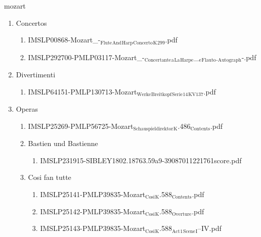 \documentclass[11pt]{article}
\begin{document}
\item mozart
\label{sec-1-1-1-1-44-49}
\begin{enumerate}
\item Concertos
\label{sec-1-1-1-1-44-49-1}
\begin{enumerate}
\item IMSLP00868-Mozart\_-$_{\text{Flute}}$$_{\text{And}}$$_{\text{Harp}}$$_{\text{Concerto}}$$_{\text{K}}$$_{\text{299}}$.pdf
\label{sec-1-1-1-1-44-49-1-1}

\item IMSLP292700-PMLP03117-Mozart\_-$_{\text{Concertante}}$$_{\text{a}}$$_{\text{La}}$$_{\text{Harpe}}$\_$_{\text{e}}$$_{\text{Flauto}}$$_{\text{-Autograph}}$-.pdf
\label{sec-1-1-1-1-44-49-1-2}
\end{enumerate}

\item Divertimenti
\label{sec-1-1-1-1-44-49-2}
\begin{enumerate}
\item IMSLP64151-PMLP130713-Mozart$_{\text{Werke}}$$_{\text{Breitkopf}}$$_{\text{Serie}}$$_{\text{14}}$$_{\text{KV137}}$.pdf
\label{sec-1-1-1-1-44-49-2-1}
\end{enumerate}

\item Operas
\label{sec-1-1-1-1-44-49-3}
\begin{enumerate}
\item IMSLP25269-PMLP56725-Mozart$_{\text{Schauspieldirektor}}$$_{\text{K}}$.486$_{\text{Contents}}$.pdf
\label{sec-1-1-1-1-44-49-3-1}

\item Bastien und Bastienne
\label{sec-1-1-1-1-44-49-3-2}
\begin{enumerate}
\item IMSLP231915-SIBLEY1802.18763.59a9-39087011221761score.pdf
\label{sec-1-1-1-1-44-49-3-2-1}
\end{enumerate}

\item Cosi fan tutte
\label{sec-1-1-1-1-44-49-3-3}
\begin{enumerate}
\item IMSLP25141-PMLP39835-Mozart$_{\text{Cosi}}$$_{\text{K}}$.588$_{\text{Contents}}$.pdf
\label{sec-1-1-1-1-44-49-3-3-1}

\item IMSLP25142-PMLP39835-Mozart$_{\text{Cosi}}$$_{\text{K}}$.588$_{\text{Overture}}$.pdf
\label{sec-1-1-1-1-44-49-3-3-2}

\item IMSLP25143-PMLP39835-Mozart$_{\text{Cosi}}$$_{\text{K}}$.588$_{\text{Act}}$$_{\text{1}}$$_{\text{Scene}}$$_{\text{I}}$--IV.pdf
\label{sec-1-1-1-1-44-49-3-3-3}


\end{enumerate}
\end{enumerate}
\end{enumerate}
\end{document}
